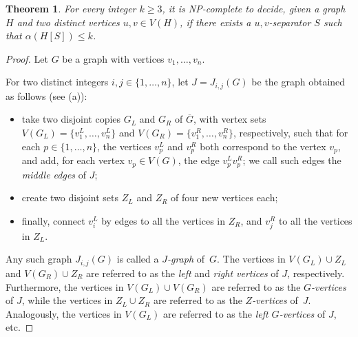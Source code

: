 \documentclass[11pt]{article}
\newtheorem{theorem}{Theorem}[section]
\theoremstyle{definition}
\newcommand{\NP}{\textup{\textsf{NP}}}
\begin{document}
\begin{theorem}\label{thm:separator}
For every integer $k\ge 3$, it is \NP-complete to decide, given a graph $H$ and two distinct vertices $u,v \in V(H)$, if there exists a $u{,}v$-separator $S$ such that $\alpha(H[S]) \leq k$.
\end{theorem}

\begin{proof}
Let $G$ be a graph with vertices $v_1, \dots, v_n$.

For two distinct integers $i,j \in \{1, \dots, n\}$, let $J = J_{i,j}(G)$
be the graph obtained as follows (see  (a)):
\begin{itemize}
    \item take two disjoint copies $G_L$ and $G_R$ of $\overline{G}$, with vertex sets $V(G_L) = \{v_1^L, \dots, v_n^L\}$ and $V(G_R) = \{v_1^R, \dots, v_n^R\}$, respectively, such that for each
    $p\in \{1, \dots, n\}$, the vertices $v_p^L$ and $v_p^R$ both correspond to the vertex $v_p$, and add, for each vertex $v_p \in V(G)$, the edge $v_p^L v_p^R$; we call such edges the \emph{middle edges} of $J$;
    \item create two disjoint sets $Z_L$ and $Z_R$ of four new vertices each;
    \item finally, connect $v_i^L$ by edges to all the vertices in $Z_R$, and $v_j^R$ to all the vertices in $Z_L$.
\end{itemize}
Any such graph $J_{i,j}(G)$ is called a \emph{$J$-graph} of~$G$.
The vertices in $V(G_L)\cup Z_L$ and $V(G_R)\cup Z_R$ are referred to as the \emph{left} and \emph{right vertices} of $J$, respectively.
Furthermore, the vertices in $V(G_L)\cup V(G_R)$ are referred to as the \emph{$G$-vertices} of $J$, while the vertices in $Z_L\cup Z_R$ are referred to as the \emph{$Z$-vertices} of~$J$.
Analogously, the vertices in $V(G_L)$ are referred to as the \emph{left $G$-vertices} of $J$, etc.


\end{proof}
\end{document}
